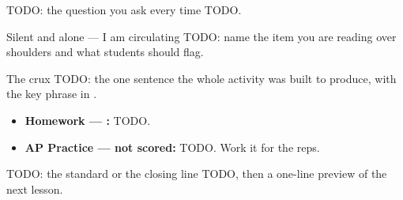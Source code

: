 \documentclass[aspectratio=169, 11pt]{beamer}
\begin{document}
\begin{frame}[t, plain]
\end{frame}

\begin{frame}[t, plain]
  \begin{block}{TODO: the question you ask every time}
    TODO.
  \end{block}
\end{frame}

\begin{frame}[t, plain]
  \begin{block}{Silent and alone --- I am circulating}
    TODO: name the item you are reading over shoulders and what students should flag.
  \end{block}
\end{frame}

\begin{frame}[t, plain]
  \begin{block}{The crux}
    TODO: the one sentence the whole activity was built to produce, with the key phrase in
    \redink{}.
  \end{block}
\end{frame}

\begin{frame}[t, plain]
  \begin{itemize}\setlength{\itemsep}{5pt}
    \item \textbf{Homework --- :} TODO.
    \item \textbf{AP Practice --- not scored:} TODO. Work it for the reps.
  \end{itemize}
  \begin{block}{TODO: the standard or the closing line}
    TODO, then a one-line preview of the next lesson.
  \end{block}
\end{frame}
\end{document}
